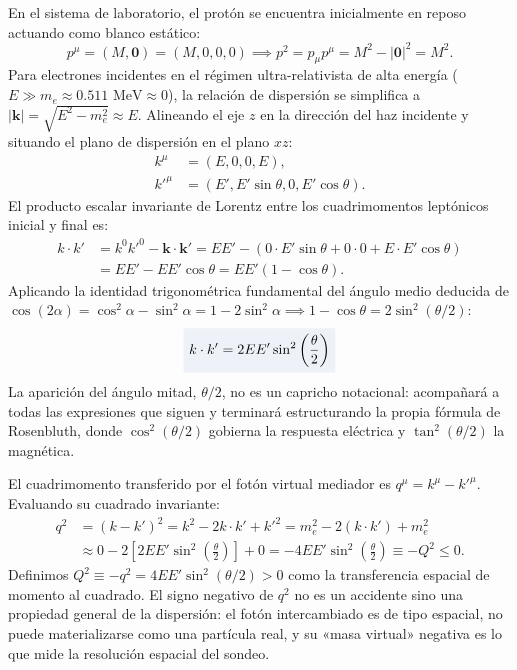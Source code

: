 \documentclass[10pt,a4paper]{article}
\newcommand{\dest}[1]{{\setlength{\fboxsep}{4pt}\colorbox{colordest}{$\displaystyle #1$}}}
\begin{document}
En el sistema de laboratorio, el protón se encuentra inicialmente en reposo actuando como blanco estático:
\begin{equation}
p^\mu = (M, \mathbf{0}) = (M, 0, 0, 0) \implies p^2 = p_\mu p^\mu = M^2 - |\mathbf{0}|^2 = M^2.
\end{equation}
Para electrones incidentes en el régimen ultra-relativista de alta energía ($E \gg m_e \approx 0.511\text{ MeV} \approx 0$), la relación de dispersión se simplifica a $|\mathbf{k}| = \sqrt{E^2 - m_e^2} \approx E$. Alineando el eje $z$ en la dirección del haz incidente y situando el plano de dispersión en el plano $xz$:
\begin{align}
k^\mu &= (E, 0, 0, E), \\
k'^\mu &= (E', E'\sin\theta, 0, E'\cos\theta).
\end{align}
El producto escalar invariante de Lorentz entre los cuadrimomentos leptónicos inicial y final es:
\begin{align}
k \cdot k' &= k^0 k'^0 - \mathbf{k} \cdot \mathbf{k}' = E E' - (0 \cdot E'\sin\theta + 0 \cdot 0 + E \cdot E'\cos\theta) \nonumber \\
&= E E' - E E' \cos\theta = E E' (1 - \cos\theta).
\end{align}
Aplicando la identidad trigonométrica fundamental del ángulo medio deducida de $\cos(2\alpha) = \cos^2\alpha - \sin^2\alpha = 1 - 2\sin^2\alpha \implies 1 - \cos\theta = 2\sin^2(\theta/2)$:
\begin{equation}
\dest{k \cdot k' = 2 E E' \sin^2\left(\frac{\theta}{2}\right)}
\label{eq:k_dot_kprime}
\end{equation}
La aparición del ángulo mitad, $\theta/2$, no es un capricho notacional: acompañará a todas las expresiones que siguen y terminará estructurando la propia fórmula de Rosenbluth, donde $\cos^2(\theta/2)$ gobierna la respuesta eléctrica y $\tan^2(\theta/2)$ la magnética.

El cuadrimomento transferido por el fotón virtual mediador es $q^\mu = k^\mu - k'^\mu$. Evaluando su cuadrado invariante:
\begin{align}
q^2 &= (k - k')^2 = k^2 - 2 k \cdot k' + k'^2 = m_e^2 - 2(k \cdot k') + m_e^2 \nonumber \\
&\approx 0 - 2 \left[ 2 E E' \sin^2\left(\frac{\theta}{2}\right) \right] + 0 = - 4 E E' \sin^2\left(\frac{\theta}{2}\right) \equiv -Q^2 \le 0.
\label{eq:q2_def}
\end{align}
Definimos $Q^2 \equiv -q^2 = 4 E E' \sin^2(\theta/2) > 0$ como la transferencia espacial de momento al cuadrado. El signo negativo de $q^2$ no es un accidente sino una propiedad general de la dispersión: el fotón intercambiado es de tipo espacial, no puede materializarse como una partícula real, y su «masa virtual» negativa es lo que mide la resolución espacial del sondeo.
\end{document}
